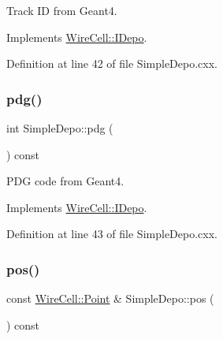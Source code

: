 Track ID from Geant4. 



Implements \hyperlink{class_wire_cell_1_1_i_depo_ab32caab0a418f3fc0f185d8fc316537a}{Wire\+Cell\+::\+I\+Depo}.



Definition at line 42 of file Simple\+Depo.\+cxx.

\mbox{\label{class_wire_cell_1_1_simple_depo_a632331ca715c30e2600b2b115139fb0d}} 
\subsubsection{\texorpdfstring{pdg()}{pdg()}}
{\footnotesize\ttfamily int Simple\+Depo\+::pdg (\begin{DoxyParamCaption}{ }\end{DoxyParamCaption}) const\hspace{0.3cm}{\ttfamily [virtual]}}



P\+DG code from Geant4. 



Implements \hyperlink{class_wire_cell_1_1_i_depo_a3a7a83ccfde95f79761cec6562fff82b}{Wire\+Cell\+::\+I\+Depo}.



Definition at line 43 of file Simple\+Depo.\+cxx.

\mbox{\label{class_wire_cell_1_1_simple_depo_ab41e2325f1fdff081ef6724389419529}} 
\subsubsection{\texorpdfstring{pos()}{pos()}}
{\footnotesize\ttfamily const \hyperlink{namespace_wire_cell_ab2b2565fa6432efbb4513c14c988cda9}{Wire\+Cell\+::\+Point} \& Simple\+Depo\+::pos (\begin{DoxyParamCaption}{ }\end{DoxyParamCaption}) const\hspace{0.3cm}{\ttfamily [virtual]}}



